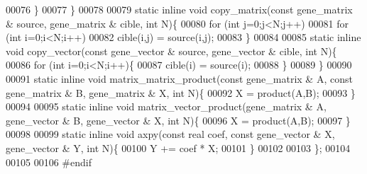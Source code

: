 \begin{DoxyCode}
00076     \}
00077   \}
00078 
00079   \textcolor{keyword}{static} \textcolor{keyword}{inline} \textcolor{keywordtype}{void} copy\_matrix(\textcolor{keyword}{const} gene\_matrix & source, gene\_matrix & cible, \textcolor{keywordtype}{int} N)\{
00080     \textcolor{keywordflow}{for} (\textcolor{keywordtype}{int} j=0;j<N;j++)
00081       \textcolor{keywordflow}{for} (\textcolor{keywordtype}{int} i=0;i<N;i++)
00082         cible(i,j) = source(i,j);
00083   \}
00084 
00085   \textcolor{keyword}{static} \textcolor{keyword}{inline} \textcolor{keywordtype}{void} copy\_vector(\textcolor{keyword}{const} gene\_vector & source, gene\_vector & cible, \textcolor{keywordtype}{int} N)\{
00086     \textcolor{keywordflow}{for} (\textcolor{keywordtype}{int} i=0;i<N;i++)\{
00087       cible(i) = source(i);
00088     \}
00089   \}
00090 
00091   \textcolor{keyword}{static} \textcolor{keyword}{inline} \textcolor{keywordtype}{void} matrix\_matrix\_product(\textcolor{keyword}{const} gene\_matrix & A, \textcolor{keyword}{const} gene\_matrix & B, gene\_matrix & X, \textcolor{keywordtype}{
      int} N)\{
00092     X = product(A,B);
00093   \}
00094 
00095   \textcolor{keyword}{static} \textcolor{keyword}{inline} \textcolor{keywordtype}{void} matrix\_vector\_product(gene\_matrix & A, gene\_vector & B, gene\_vector & X, \textcolor{keywordtype}{int} N)\{
00096     X = product(A,B);
00097   \}
00098 
00099   \textcolor{keyword}{static} \textcolor{keyword}{inline} \textcolor{keywordtype}{void} axpy(\textcolor{keyword}{const} real coef, \textcolor{keyword}{const} gene\_vector & X, gene\_vector & Y, \textcolor{keywordtype}{int} N)\{
00100     Y += coef * X;
00101   \}
00102 
00103 \};
00104 
00105 
00106 \textcolor{preprocessor}{#endif}
\end{DoxyCode}
